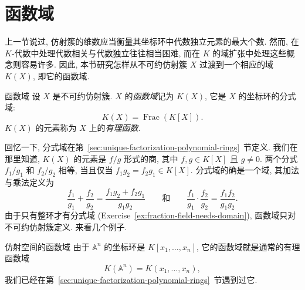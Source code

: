 \section{函数域}\label{sec:function-fields}

上一节说过, 仿射簇的维数应当衡量其坐标环中代数独立元素的最大个数. 然而, 在 $K$-代数中处理代数相关与代数独立往往相当困难, 而在 $K$ 的域扩张中处理这些概念则容易许多. 因此, 本节研究怎样从不可约仿射簇 $X$ 过渡到一个相应的域 $K(X)$, 即它的函数域.

\begin{Definition}{函数域}\leavevmode\label{def:function-field}
设 $X$ 是不可约仿射簇. $X$ 的\emph{函数域}记为 $K(X)$, 它是 $X$ 的坐标环的分式域:
\[
  K(X)=\operatorname{Frac}(K[X]).
\]
$K(X)$ 的元素称为 $X$ 上的\emph{有理函数}.
\end{Definition}

回忆一下, 分式域在第~\ref{sec:unique-factorization-polynomial-rings}~节定义. 我们在那里知道, $K(X)$ 的元素是 $f/g$ 形式的商, 其中 $f,g\in K[X]$ 且 $g\neq0$. 两个分式 $f_{1}/g_{1}$ 和 $f_{2}/g_{2}$ 相等, 当且仅当 $f_{1}g_{2}=f_{2}g_{1}\in K[X]$. 分式域的确是一个域, 其加法与乘法定义为
\[
  \frac{f_{1}}{g_{1}}+\frac{f_{2}}{g_{2}}
    =\frac{f_{1}g_{2}+f_{2}g_{1}}{g_{1}g_{2}}
  \qquad\text{和}\qquad
  \frac{f_{1}}{g_{1}}\cdot\frac{f_{2}}{g_{2}}=\frac{f_{1}f_{2}}{g_{1}g_{2}}.
\]
由于只有整环才有分式域 (Exercise~\ref{ex:fraction-field-needs-domain}), 函数域只对不可约仿射簇定义. 来看几个例子.

\begin{Example}{仿射空间的函数域}\leavevmode\label{ex:function-field-of-affine-space}
由于 $\mathbb{A}^{n}$ 的坐标环是 $K[x_{1},\ldots,x_{n}]$, 它的函数域就是通常的有理函数域
\[
  K(\mathbb{A}^{n})=K(x_{1},\ldots,x_{n}),
\]
我们已经在第~\ref{sec:unique-factorization-polynomial-rings}~节遇到过它.
\end{Example}

